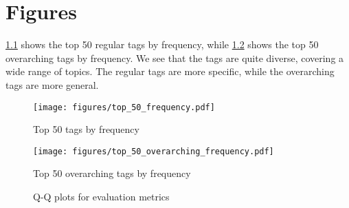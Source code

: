 \chapter{Figures}\label{sec:figures_appendix}

\cref{fig:top_50_frequency} shows the top 50 regular tags by frequency, while \cref{fig:top_50_overarching_frequency} shows the top 50 overarching tags by frequency. We see that the tags are quite diverse, covering a wide range of topics. The regular tags are more specific, while the overarching tags are more general.

\begin{figure}[h]
    \centering
    \texttt{[image: figures/top\_50\_frequency.pdf]}
    \caption{Top 50 tags by frequency}
    \label{fig:top_50_frequency}
\end{figure}

\begin{figure}[h]
    \centering
    \texttt{[image: figures/top\_50\_overarching\_frequency.pdf]}
    \caption{Top 50 overarching tags by frequency}
    \label{fig:top_50_overarching_frequency}
\end{figure}

\begin{figure}[h]
    \centering
    \hfill

    \caption{Q-Q plots for evaluation metrics}
    \label{fig:all_qq_plots}
\end{figure}